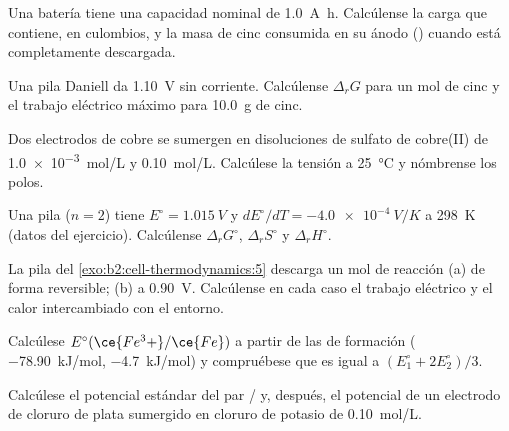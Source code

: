 \begin{exercise}[$\star$]\label{exo:b2:cell-thermodynamics:2}
Una batería tiene una capacidad nominal de \qty{1.0}{A.h}. Calcúlense la carga que contiene, en culombios,
y la masa de cinc consumida en su ánodo () cuando está
completamente descargada.
\end{exercise}

\begin{exercise}[$\star$]\label{exo:b2:cell-thermodynamics:3}
Una pila Daniell da \qty{1.10}{V} sin corriente. Calcúlense $\Delta_r G$ para un
mol de cinc y el trabajo eléctrico máximo para \qty{10.0}{g} de cinc.
\end{exercise}

\begin{exercise}[$\star$]\label{exo:b2:cell-thermodynamics:4}
Dos electrodos de cobre se sumergen en disoluciones de sulfato de cobre(II) de \qty{1.0e-3}{mol/L}
y \qty{0.10}{mol/L}. Calcúlese la tensión a \qty{25}{\degreeCelsius} y nómbrense los
polos.
\end{exercise}

\begin{exercise}[$\star\star$]\label{exo:b2:cell-thermodynamics:5}
Una pila ($n = 2$) tiene $E^\circ = \qty{1.015}{V}$ y $dE^\circ/dT = \qty{-4.0e-4}{V/K}$
a \qty{298}{K} (datos del ejercicio). Calcúlense $\Delta_r G^\circ$, $\Delta_r S^\circ$ y
$\Delta_r H^\circ$.
\end{exercise}

\begin{exercise}[$\star\star$]\label{exo:b2:cell-thermodynamics:6}
La pila del \cref{exo:b2:cell-thermodynamics:5} descarga un mol de reacción
(a) de forma reversible; (b) a \qty{0.90}{V}. Calcúlense en cada caso el trabajo eléctrico y
el calor intercambiado con el entorno.
\end{exercise}

\begin{exercise}[$\star\star$]\label{exo:b2:cell-thermodynamics:7}
Calcúlese $E^\circ(\ce{Fe^3+}/\ce{Fe})$ a partir de las  de formación
( \qty{-78.90}{kJ/mol},  \qty{-4.7}{kJ/mol}) y compruébese que
es igual a $(E_1^\circ + 2E_2^\circ)/3$.
\end{exercise}

\begin{exercise}[$\star\star$]\label{exo:b2:cell-thermodynamics:8}
Calcúlese el potencial estándar del par / y, después, el
potencial de un electrodo de cloruro de plata sumergido en cloruro de potasio de
\qty{0.10}{mol/L}.
\end{exercise}

